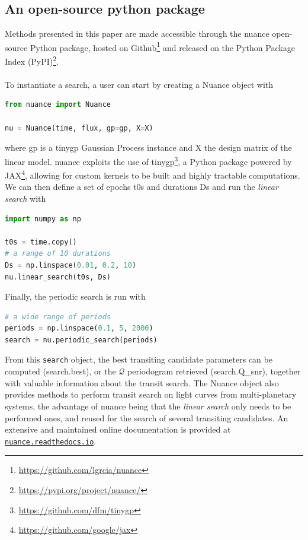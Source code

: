 \documentclass{aastex631}
\newcommand{\footlink}[1]{\footnote{\url{#1}}}
\begin{document}
\subsection{An open-source python package}
Methods presented in this paper are made accessible through the \textsf{nuance} open-source Python package, hosted on Github\footnote{\href{https://github.com/lgrcia/nuance}{https://github.com/lgrcia/nuance}} and released on the Python Package Index (PyPI)\footlink{https://pypi.org/project/nuance/}. 
\\\\
To instantiate a search, a user can start by creating a \textsf{Nuance} object with
\begin{lstlisting}[language=Python]
from nuance import Nuance

nu = Nuance(time, flux, gp=gp, X=X)
\end{lstlisting}
where \textsf{gp} is a \textsf{tinygp} Gaussian Process instance and \textsf{X} the design matrix of the linear model. \textsf{nuance} exploits the use of \textsf{tinygp}\footnote{\href{https://github.com/dfm/tinygp}{https://github.com/dfm/tinygp}}, a Python package powered by \textsf{JAX}\footnote{\href{https://github.com/google/jax}{https://github.com/google/jax}}, allowing for custom kernels to be built and highly tractable computations. We can then define a set of epochs \textsf{t0s} and durations \textsf{Ds} and run the \textit{linear search} with
\begin{lstlisting}[language=Python,linewidth=\linewidth]
import numpy as np

t0s = time.copy()
# a range of 10 durations
Ds = np.linspace(0.01, 0.2, 10)
nu.linear_search(t0s, Ds)
\end{lstlisting}
Finally, the periodic search is run with
\begin{lstlisting}[language=Python]
# a wide range of periods
periods = np.linspace(0.1, 5, 2000)
search = nu.periodic_search(periods)
\end{lstlisting}
From this \texttt{search} object, the best transiting candidate parameters can be computed (\textsf{search.best}), or the $\mathcal{Q}$ periodogram retrieved (\textsf{search.Q\_snr}), together with valuable information about the transit search. The \textsf{Nuance} object also provides methods to perform transit search on light curves from multi-planetary systems, the advantage of \textsf{nuance} being that the \textit{linear search} only needs to be performed ones, and reused for the search of several transiting candidates. An extensive and maintained online documentation is provided at \href{https://nuance.readthedocs.io}{\texttt{nuance.readthedocs.io}}.
\end{document}
